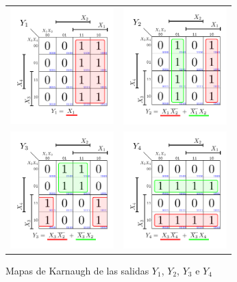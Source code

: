 \begin{center}
	
\begin{figure}[H]
   \centering
\begin{tabular}{cc}
\includegraphics[width=4cm,trim={0.5cm 0.5cm  0.25cm 0.25cm},clip]{Ejercicio_4/Karnaugh/Y_1.pdf}&
\includegraphics[width=4cm,trim={0.5cm 0.5cm  0.25cm 0.25cm},clip]{Ejercicio_4/Karnaugh/Y_2.pdf}\\
\includegraphics[width=4cm,trim={0.5cm 0.5cm  0.25cm 0.25cm},clip]{Ejercicio_4/Karnaugh/Y_3.pdf}&
\includegraphics[width=4cm,trim={0.5cm 0.5cm  0.25cm 0.25cm},clip]{Ejercicio_4/Karnaugh/Y_4.pdf}
\end{tabular}
    \caption{Mapas de Karnaugh de las salidas $Y_1$, $Y_2$, $Y_3$ e $Y_4$}

\end{figure}
\end{center}
